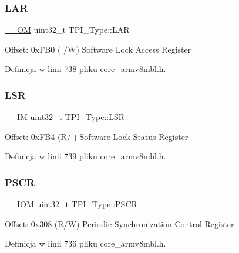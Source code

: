 \subsubsection{\texorpdfstring{L\+AR}{LAR}}
{\footnotesize\ttfamily \hyperlink{core__sc300_8h_a0ea2009ed8fd9ef35b48708280fdb758}{\+\_\+\+\_\+\+OM} uint32\+\_\+t T\+P\+I\+\_\+\+Type\+::\+L\+AR}

Offset\+: 0x\+F\+B0 ( /W) Software Lock Access Register 

Definicja w linii 738 pliku core\+\_\+armv8mbl.\+h.

\mbox{\label{struct_t_p_i___type_af5373794b1c024b28a2a59a9eab6498e}} 
\subsubsection{\texorpdfstring{L\+SR}{LSR}}
{\footnotesize\ttfamily \hyperlink{core__sc300_8h_a4cc1649793116d7c2d8afce7a4ffce43}{\+\_\+\+\_\+\+IM} uint32\+\_\+t T\+P\+I\+\_\+\+Type\+::\+L\+SR}

Offset\+: 0x\+F\+B4 (R/ ) Software Lock Status Register 

Definicja w linii 739 pliku core\+\_\+armv8mbl.\+h.

\mbox{\label{struct_t_p_i___type_ad092e61fccb6752d3f4adbbd4a7e1567}} 
\subsubsection{\texorpdfstring{P\+S\+CR}{PSCR}}
{\footnotesize\ttfamily \hyperlink{core__sc300_8h_ab6caba5853a60a17e8e04499b52bf691}{\+\_\+\+\_\+\+I\+OM} uint32\+\_\+t T\+P\+I\+\_\+\+Type\+::\+P\+S\+CR}

Offset\+: 0x308 (R/W) Periodic Synchronization Control Register 

Definicja w linii 736 pliku core\+\_\+armv8mbl.\+h.

\mbox{\label{struct_t_p_i___type_a409fb08ad6d58c17fcb7f59d65db6f93}} 

